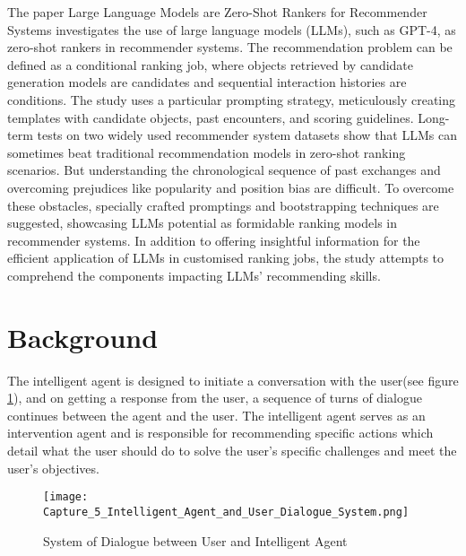 \documentclass[conference]{IEEEtran}
\begin{document}
The paper Large Language Models are Zero-Shot Rankers for Recommender Systems \cite{hou2023large} investigates the use of large language models (LLMs), such as GPT-4, as zero-shot rankers in recommender systems. The recommendation problem can be defined as a conditional ranking job, where objects retrieved by candidate generation models are candidates and sequential interaction histories are conditions. The study uses a particular prompting strategy, meticulously creating templates with candidate objects, past encounters, and scoring guidelines. Long-term tests on two widely used recommender system datasets show that LLMs can sometimes beat traditional recommendation models in zero-shot ranking scenarios. But understanding the chronological sequence of past exchanges and overcoming prejudices like popularity and position bias are difficult. To overcome these obstacles, specially crafted promptings and bootstrapping techniques are suggested, showcasing LLMs potential as formidable ranking models in recommender systems. In addition to offering insightful information for the efficient application of LLMs in customised ranking jobs, the study attempts to comprehend the components impacting LLMs' recommending skills.



\section{Background}

The intelligent agent is designed to initiate a conversation with the user(see figure \ref{LP2}), and on getting a response from the user, a sequence of turns of dialogue continues between the agent and the user. The intelligent agent serves as an intervention agent and is responsible for recommending specific actions which detail what the user should do to solve the user's specific challenges and meet the user's objectives.

\begin{figure}[!ht] %
\centering
\texttt{[image: Capture\_5\_Intelligent\_Agent\_and\_User\_Dialogue\_System.png]}
\caption{System of Dialogue between User and Intelligent Agent\cite{xie2021moca}}
\label{LP2}
\end{figure}
\end{document}
